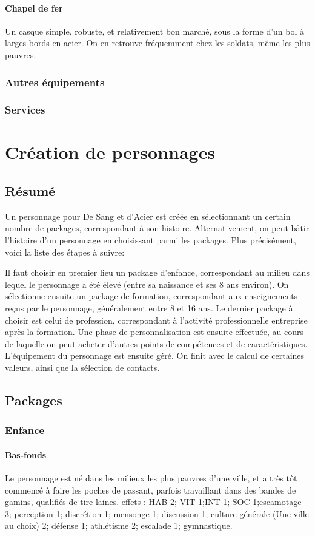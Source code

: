 \documentclass[10pt,a4paper,twocolumn]{book}
\begin{document}
\subsection*{Chapel de fer}
Un casque simple, robuste, et relativement bon marché, sous la forme d'un bol à larges bords en acier. On en retrouve fréquemment chez les soldats, même les plus pauvres.
\section{Autres équipements}
\section{Services}

\part{Création de personnages}
\chapter{Résumé}
Un personnage pour De Sang et d’Acier est créée en sélectionnant un certain nombre de packages, correspondant à son histoire. Alternativement, on peut bâtir l’histoire d’un personnage en choisissant parmi les packages.
Plus précisément, voici la liste des étapes à suivre:

Il faut choisir en premier lieu un package d’enfance, correspondant au milieu dans lequel le personnage a été élevé (entre sa naissance et ses 8 ans environ).
On sélectionne ensuite un package de formation, correspondant aux enseignements reçus par le personnage, généralement entre 8 et 16 ans.
Le dernier package à choisir est celui de profession, correspondant à l’activité professionnelle entreprise après la formation.
Une phase de personnalisation est ensuite effectuée, au cours de laquelle on peut acheter d’autres points de compétences et de caractéristiques.
L’équipement du personnage est ensuite géré.
On finit avec le calcul de certaines valeurs, ainsi que la sélection de contacts.
\chapter{Packages}
\section{Enfance}
\subsection*{Bas-fonds}
Le personnage est né dans les milieux les plus pauvres d’une ville, et a très tôt commencé à faire les poches de passant, parfois travaillant dans des bandes de gamins, qualifiés de tire-laines.
effets : HAB 2; VIT 1;INT 1; SOC 1;escamotage 3; perception 1; discrétion 1; mensonge 1; discussion 1; culture générale (Une ville au choix) 2; défense 1; athlétisme 2; escalade 1; gymnastique.
\end{document}
